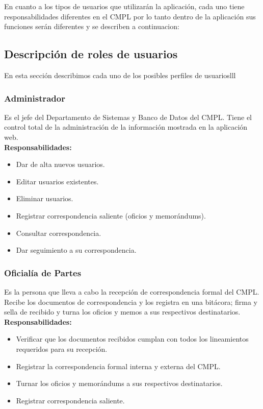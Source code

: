 En cuanto a los tipos de usuarios que utilizarán la aplicación, cada uno tiene responsabilidades diferentes en el CMPL por lo tanto dentro de la aplicación sus funciones serán diferentes y se describen a continuacion: \\
\subsection{Descripción de roles de usuarios}
En esta sección describimos cada uno de los posibles perfiles de usuarioslll
\subsubsection{Administrador}
Es el jefe del Departamento de Sistemas y Banco de Datos del CMPL. Tiene el control total de la administración de la información mostrada en la aplicación web.\\

\textbf{Responsabilidades:}
\begin{itemize}
	\item Dar de alta nuevos usuarios.
	\item Editar usuarios existentes.
	\item Eliminar usuarios.
	\item Registrar correspondencia saliente (oficios y memorándums).
	\item Consultar correspondencia.
	\item Dar seguimiento a su correspondencia.
\end{itemize}

\subsubsection{Oficialía de Partes}
Es la persona que lleva a cabo la recepción de correspondencia formal del CMPL. Recibe los documentos de correspondencia y los registra en una bitácora; firma y sella de recibido y turna los oficios y memos a sus respectivos destinatarios.\\

\textbf{Responsabilidades:}
\begin{itemize}
	\item Verificar que los documentos recibidos cumplan con todos los lineamientos requeridos para su recepción.
	\item Registrar la correspondencia formal interna y externa del CMPL.
	\item Turnar los oficios y memorándums a sus respectivos destinatarios.
	\item Registrar correspondencia saliente.
\end{itemize}

